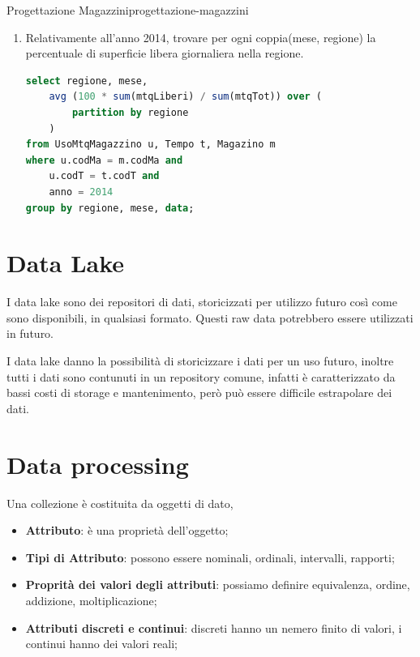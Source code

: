 \documentclass[12pt]{article}
\begin{document}
\begin{problem}{Progettazione Magazzini}{progettazione-magazzini}
\begin{enumerate}
\begin{lstlisting}[language=sql]
from UsoProdMagazzino u, Tempo t, Magazzino m
where u.codMa = m.codMa and
    u.codT = t.codT and
    anno = 2015
group by regione, mese, data;
\end{lstlisting}
        \item Relativamente all’anno 2014, trovare per ogni coppia(mese, regione) la percentuale di superficie libera giornaliera nella regione.
\begin{lstlisting}[language=sql]
select regione, mese,
    avg (100 * sum(mtqLiberi) / sum(mtqTot)) over (
        partition by regione
    )
from UsoMtqMagazzino u, Tempo t, Magazino m
where u.codMa = m.codMa and
    u.codT = t.codT and
    anno = 2014
group by regione, mese, data;
\end{lstlisting}
    \end{enumerate}
\end{problem}




\section{Data Lake}
I data lake sono dei repositori di dati, storicizzati per utilizzo futuro cos\`i come sono disponibili, in qualsiasi formato. Questi raw data potrebbero essere utilizzati in futuro.

I data lake danno la possibilit\`a di storicizzare i dati per un uso futuro, inoltre tutti i dati sono contunuti in un repository comune, infatti \`e caratterizzato da bassi costi di storage e mantenimento, per\`o pu\`o essere difficile estrapolare dei dati.

\section{Data processing}
Una collezione \`e costituita da oggetti di dato,
\begin{itemize}
    \item \textbf{Attributo}: \`e una propriet\`a dell'oggetto;
    \item \textbf{Tipi di Attributo}: possono essere nominali, ordinali, intervalli, rapporti;
    \item \textbf{Proprit\`a dei valori degli attributi}: possiamo definire equivalenza, ordine, addizione, moltiplicazione;
    \item \textbf{Attributi discreti e continui}:  discreti hanno un nemero finito di valori, i continui hanno dei valori reali;
\end{itemize}
\end{document}
